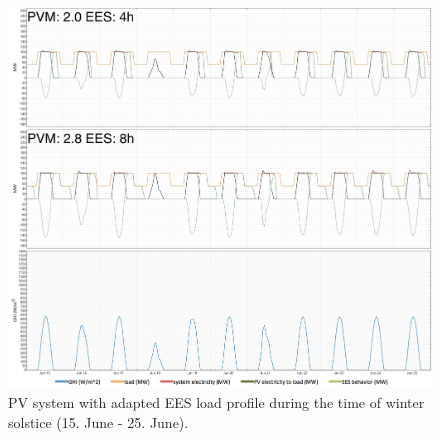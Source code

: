 \begin{figure}[!bhtp]  
\centering
\includegraphics[width=1\linewidth]{FIG/PV_winter_load}
\caption[PV system with adapted EES load profile during the time of winter solstice.]{PV system with adapted EES load profile during the time of winter solstice (15. June - 25. June).}\label{PV_winter_load}
\end{figure}


